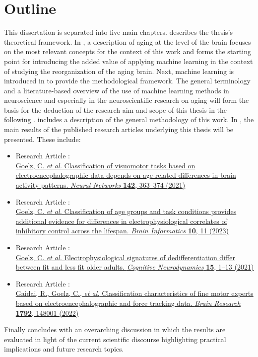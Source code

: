 \section{Outline}
This dissertation is separated into five main chapters.  describes the thesis's theoretical framework. In , a description of aging at the level of the brain focuses on the most relevant concepts for the context of this work and forms the starting point for introducing the added value of applying machine learning in the context of studying the reorganization of the aging brain. Next, machine learning is introduced in  to provide the methodological framework. The general terminology and a literature-based overview of the use of machine learning methods in neuroscience and especially in the neuroscientific research on aging will form the basis for the deduction of the research aim and scope of this thesis in the following .  includes a description of the general methodology of this work. In , the main results of the published research articles underlying this thesis will be presented. These include:

\begin{itemize}
\item Research Article :\\ \hyperref[pub:paperI]{Goelz, C. \textit{et al.} Classification of visuomotor tasks based on electroencephalographic data depends on age-related differences in brain activity patterns. \textit{Neural Networks} \textbf{142}, 363--374 (2021)}
\newpage
\item Research Article :\\ \hyperref[pub:paperII]{Goelz, C. \textit{et al.} Classification of age groups and task conditions provides additional evidence for differences in electrophysiological correlates of inhibitory control across the lifespan. \textit{Brain Informatics} \textbf{10}, 11 (2023)}
\item Research Article :\\ \hyperref[pub:paperIII]{Goelz, C. \textit{et al.} Electrophysiological signatures of dedifferentiation differ between fit and less fit older adults. \textit{Cognitive Neurodynamics} \textbf{15}, 1--13 (2021)}
\item Research Article :\\ \hyperref[pub:paperIV]{Gaidai, R., Goelz, C., \textit{et al.} Classification characteristics of fine motor experts based on electroencephalographic and force tracking data. \textit{Brain Research} \textbf{1792}, 148001 (2022)}
\end{itemize}

\noindent Finally  concludes with an overarching discussion in which the results are evaluated in light of the current scientific discourse highlighting practical implications and future research topics. 
